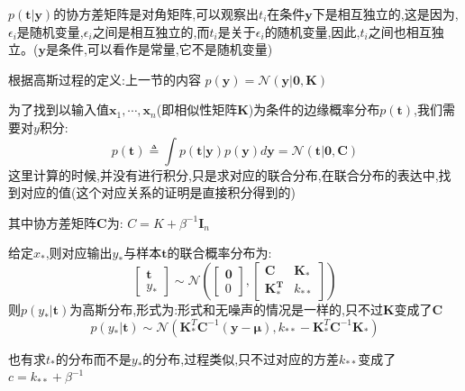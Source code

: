\documentclass[UTF8,a4paper]{ctexart}
\begin{document}
            {\color{blue}$p(\bm t|\bm y)$的协方差矩阵是对角矩阵,可以观察出$t_i$在条件$\bm y$下是相互独立的,这是因为,$\epsilon_i$是随机变量,$\epsilon_i$之间是相互独立的,而$t_i$是关于$\epsilon_i$的随机变量,因此,$t_i$之间也相互独立。($\bm y$是条件,可以看作是常量,它不是随机变量)}

            根据高斯过程的定义:{\color{blue}上一节的内容}
            $p(\bm y) = \mathcal N(\bm y | \bm 0,\bm K)$

            为了找到以输入值$\bm x_1 , \cdots,\bm x_n$(即相似性矩阵$\bm K$)为条件的边缘概率分布$p(\bm t)$,我们需要对$y$积分:
            \begin{equation}
                p(\bm t) \triangleq \int p(\bm t|\bm y)p(\bm y)d\bm y = \mathcal{N}(\bm t|\bm 0,\bm C)
            \end{equation}
            {\color{blue}这里计算的时候,并没有进行积分,只是求对应的联合分布,在联合分布的表达中,找到对应的值(这个对应关系的证明是直接积分得到的)}

            其中协方差矩阵$\bm C$为:
            $C = K + \beta^{-1}\bm I_n$

            给定$x_*$,则对应输出$y_*$与样本$\bm t$的联合概率分布为:
            \begin{equation}
                \left [ \begin{array}{c}
                    \bm{t} \\ y_*
                \end{array} \right ] \sim \mathcal{N}
                \left (
                    \left [\begin{array}{c}
                    \bm{0} \\ 0
                    \end{array} \right ] ,
                    \left [\begin{array}{cc}
                    \bm{C} & \bm{K_*} \\
                    \bm{K_*^T} & k_{**}
                    \end{array} \right ]
                \right )
            \end{equation}
            则$p(y_*|\bm t)$为高斯分布,形式为:{\color{blue}形式和无噪声的情况是一样的,只不过$\bm K$变成了$\bm C$}
            \begin{equation}
                p(y_*|\bm t) \sim \mathcal N (\bm K_*^T\bm C^{-1}(\bm y - \bm \mu),k_{**} - \bm K_*^T\bm C^{-1}\bm K_*)
            \end{equation}

            {\color{blue}也有求$t_*$的分布而不是$y_*$的分布,过程类似,只不过对应的方差$k_{**}$变成了$c = k_{**} + \beta^{-1}$}
\end{document}
